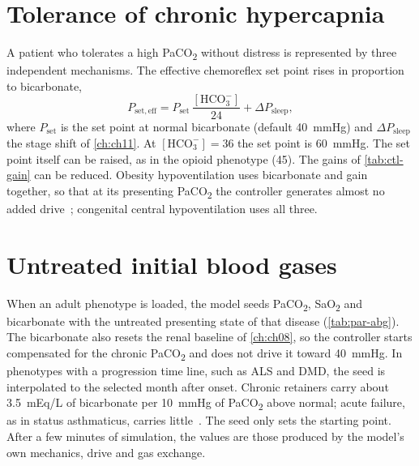 \section{Tolerance of chronic hypercapnia}
\label{sec:par-tol}
A patient who tolerates a high PaCO\textsubscript{2} without distress is represented by three independent mechanisms. The effective chemoreflex set point rises in proportion to bicarbonate,
\begin{equation}
P_{\mathrm{set,eff}}=P_{\mathrm{set}}\,\frac{[\mathrm{HCO_3^-}]}{24}+\Delta P_{\mathrm{sleep}},
\label{eq:par-set}
\end{equation}
where $P_{\mathrm{set}}$ is the set point at normal bicarbonate (default \SI{40}{\mmHg}) and $\Delta P_{\mathrm{sleep}}$ the stage shift of \cref{ch:ch11}. At $[\mathrm{HCO_3^-}]=36$ the set point is \SI{60}{\mmHg}. The set point itself can be raised, as in the opioid phenotype (45). The gains of \cref{tab:ctl-gain} can be reduced. Obesity hypoventilation uses bicarbonate and gain together, so that at its presenting PaCO\textsubscript{2} the controller generates almost no added drive~\citep{piper2011}; congenital central hypoventilation uses all three.

\section{Untreated initial blood gases}
\label{sec:par-abg}
When an adult phenotype is loaded, the model seeds PaCO\textsubscript{2}, SaO\textsubscript{2} and bicarbonate with the untreated presenting state of that disease (\cref{tab:par-abg}). The bicarbonate also resets the renal baseline of \cref{ch:ch08}, so the controller starts compensated for the chronic PaCO\textsubscript{2} and does not drive it toward \SI{40}{\mmHg}. In phenotypes with a progression time line, such as ALS and DMD, the seed is interpolated to the selected month after onset. Chronic retainers carry about \SI{3.5}{mEq/L} of bicarbonate per \SI{10}{\mmHg} of PaCO\textsubscript{2} above normal; acute failure, as in status asthmaticus, carries little~\citep{brackett1969}. The seed only sets the starting point. After a few minutes of simulation, the values are those produced by the model's own mechanics, drive and gas exchange.

